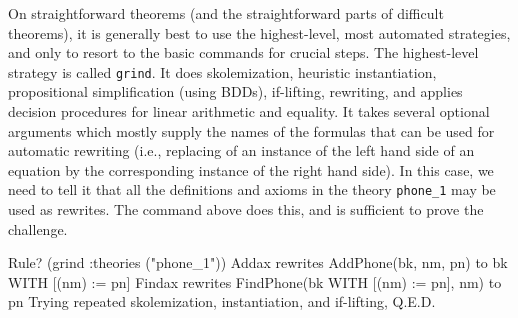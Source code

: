 On straightforward theorems (and the straightforward parts of
difficult theorems), it is generally best to use the highest-level,
most automated strategies, and only to resort to the basic commands
for crucial steps.  The highest-level strategy is called {\tt grind}.
It does skolemization, heuristic instantiation, propositional
simplification (using BDDs), if-lifting, rewriting, and applies
decision procedures for linear arithmetic and equality.  It takes
several optional arguments which mostly supply the names of the
formulas that can be used for automatic rewriting (i.e., replacing of
an instance of the left hand side of an equation by the corresponding
instance of the right hand side).  In this case, we need to tell it
that all the definitions and axioms in the theory {\tt phone\_1} may
be used as rewrites.  The command above does this, and is sufficient
to prove the challenge.
\begin{pvsexample}
Rule? (grind :theories ("phone_1"))
Addax rewrites AddPhone(bk, nm, pn)
  to bk WITH [(nm) := pn]
Findax rewrites FindPhone(bk WITH [(nm) := pn], nm)
  to pn
Trying repeated skolemization, instantiation, and if-lifting,
Q.E.D.
\end{pvsexample}

